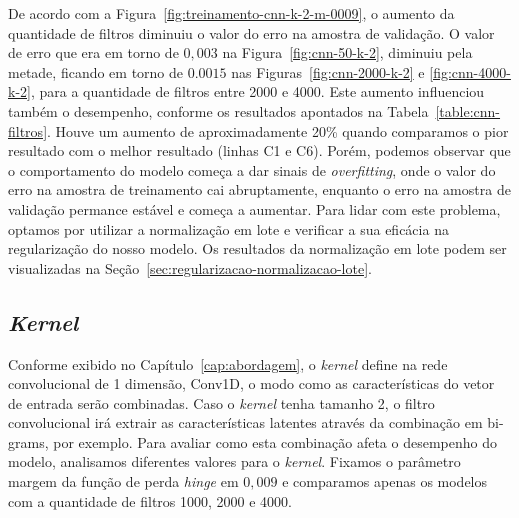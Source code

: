 De acordo com a Figura~\ref{fig:treinamento-cnn-k-2-m-0009}, o aumento da quantidade de filtros diminuiu o valor do erro na amostra de validação. O valor de erro que era em torno de $0,003$ na Figura~\ref{fig:cnn-50-k-2}, diminuiu pela metade, ficando em torno de $0.0015$ nas Figuras~\ref{fig:cnn-2000-k-2} e \ref{fig:cnn-4000-k-2}, para a quantidade de filtros entre 2000 e 4000. Este aumento influenciou também o desempenho, conforme os resultados apontados na Tabela~\ref{table:cnn-filtros}. Houve um aumento de aproximadamente 20\% quando comparamos o pior resultado com o melhor resultado (linhas C1 e C6). Porém, podemos observar que o comportamento do modelo começa a dar sinais de \textit{overfitting}, onde o valor do erro na amostra de treinamento cai abruptamente, enquanto o erro na amostra de validação permance estável e começa a aumentar. Para lidar com este problema, optamos por utilizar a normalização em lote e verificar a sua eficácia na regularização do nosso modelo. Os resultados da normalização em lote podem ser visualizadas na Seção~\ref{sec:regularizacao-normalizacao-lote}. 

\subsection{\textit{Kernel}}

Conforme exibido no Capítulo~\ref{cap:abordagem}, o \textit{kernel} define na rede convolucional de 1 dimensão, Conv1D, o modo como as características do vetor de entrada serão combinadas. Caso o \textit{kernel} tenha tamanho 2, o filtro convolucional irá extrair as características latentes através da combinação em bi-grams, por exemplo. Para avaliar como esta combinação afeta o desempenho do modelo, analisamos diferentes valores para o \textit{kernel}. Fixamos o parâmetro margem da função de perda \textit{hinge} em $0,009$ e comparamos apenas os modelos com a quantidade de filtros 1000, 2000 e 4000. 

